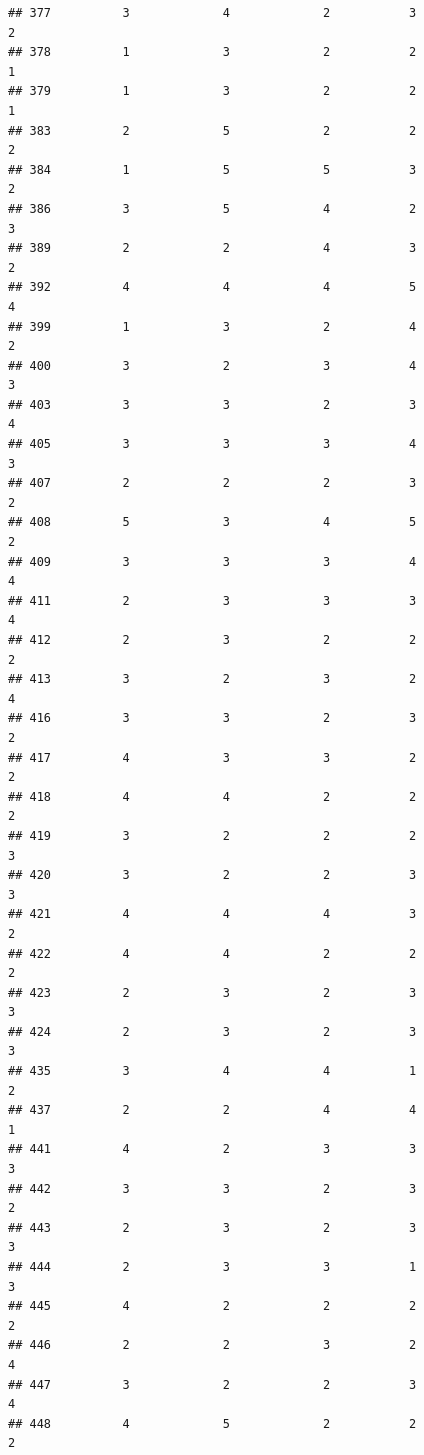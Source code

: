 \documentclass[
]{article}
\begin{document}
\begin{verbatim}
## 377          3             4             2           3             2
## 378          1             3             2           2             1
## 379          1             3             2           2             1
## 383          2             5             2           2             2
## 384          1             5             5           3             2
## 386          3             5             4           2             3
## 389          2             2             4           3             2
## 392          4             4             4           5             4
## 399          1             3             2           4             2
## 400          3             2             3           4             3
## 403          3             3             2           3             4
## 405          3             3             3           4             3
## 407          2             2             2           3             2
## 408          5             3             4           5             2
## 409          3             3             3           4             4
## 411          2             3             3           3             4
## 412          2             3             2           2             2
## 413          3             2             3           2             4
## 416          3             3             2           3             2
## 417          4             3             3           2             2
## 418          4             4             2           2             2
## 419          3             2             2           2             3
## 420          3             2             2           3             3
## 421          4             4             4           3             2
## 422          4             4             2           2             2
## 423          2             3             2           3             3
## 424          2             3             2           3             3
## 435          3             4             4           1             2
## 437          2             2             4           4             1
## 441          4             2             3           3             3
## 442          3             3             2           3             2
## 443          2             3             2           3             3
## 444          2             3             3           1             3
## 445          4             2             2           2             2
## 446          2             2             3           2             4
## 447          3             2             2           3             4
## 448          4             5             2           2             2

\end{verbatim}
\end{document}
